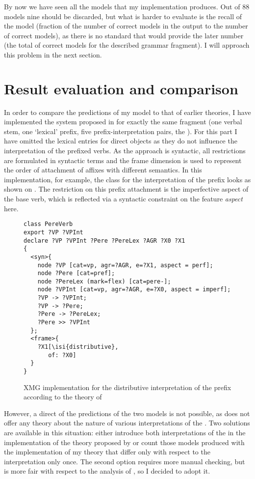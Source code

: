 By now we have seen all the models that my implementation produces. Out of 88 models nine should be discarded, but what is harder to evaluate is the recall of the model (fraction of the number of correct models in the output to the number of correct models), as there is no standard that would provide the later number (the total of correct models for the described grammar fragment). I will approach this problem in the next section.

\section{Result evaluation and comparison}
In order to compare the predictions of my model to that of earlier theories, I have implemented the system proposed in \citet{Tatevosov:09} for exactly the same fragment (one verbal stem, one `lexical' prefix, five prefix-interpretation pairs, the ). For this part I have omitted the lexical entries for direct objects as they do not influence the interpretation of the prefixed verbs. As the approach is syntactic, all restrictions are formulated in syntactic terms and the frame dimension is used to represent the order of attachment of affixes with different semantics. In this implementation, for example, the class for the  interpretation of the prefix  looks as shown on . The restriction on this prefix attachment is the imperfective aspect of the base verb, which is reflected via a syntactic constraint on the feature \textit{aspect} here.

\begin{figure}
\begin{lstlisting}[style=xmg]
class PereVerb
export ?VP ?VPInt 
declare ?VP ?VPInt ?Pere ?PereLex ?AGR ?X0 ?X1 
{
  <syn>{
    node ?VP [cat=vp, agr=?AGR, e=?X1, aspect = perf];
    node ?Pere [cat=pref];
    node ?PereLex (mark=flex) [cat=pere-];
    node ?VPInt [cat=vp, agr=?AGR, e=?X0, aspect = imperf];
    ?VP -> ?VPInt;
    ?VP -> ?Pere;
    ?Pere -> ?PereLex;
    ?Pere >> ?VPInt
  };
  <frame>{
    ?X1[\isi{distributive},
       of: ?X0]
  }
}
\end{lstlisting}
\caption{XMG implementation for the distributive interpretation of the prefix  according to the theory of \citet{Tatevosov:09}\label{xmg:Tat:pere}}
\end{figure}

However, a direct  of the predictions of the two models is not possible, as \citet{Tatevosov:09} does not offer any theory about the nature of various interpretations of the . Two solutions are available in this situation: either introduce both interpretations of the  in the implementation of the theory proposed by \citet{Tatevosov:09} or count those models produced with the implementation of my theory that differ only with respect to the interpretation only once. The second option requires more manual checking, but is more fair with respect to the analysis of \citet{Tatevosov:09}, so I decided to adopt it.

